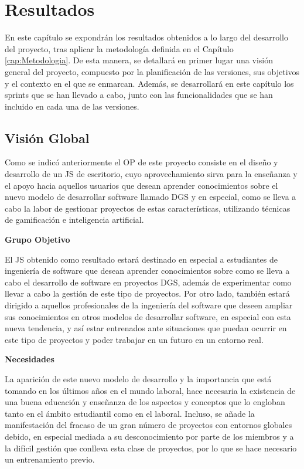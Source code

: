 \chapter{Resultados}
\label{cap:Resultados}

En este capítulo se expondrán los resultados obtenidos a lo largo del desarrollo del proyecto, tras aplicar la metodología definida en el Capítulo \ref{cap:Metodologia}. De esta manera, se detallará en primer lugar una visión general del proyecto, compuesto por la planificación de las versiones, sus objetivos y el contexto en el que se enmarcan. Además, se desarrollará en este capítulo los sprints que se han llevado a cabo, junto con las funcionalidades que se han incluido en cada una de las versiones.

\section{Visión Global}
\label{sec:VisionGlobal}

Como se indicó anteriormente el OP de este proyecto consiste en el diseño y desarrollo de un JS de escritorio, cuyo aprovechamiento sirva para la enseñanza y el apoyo hacia aquellos usuarios que desean aprender conocimientos sobre el nuevo modelo de desarrollar software llamado DGS y en especial, como se lleva a cabo la labor de gestionar proyectos de estas características, utilizando técnicas de gamificación e inteligencia artificial.

\textbf{Grupo Objetivo}

El JS obtenido como resultado estará destinado en especial a estudiantes de ingeniería de software que desean aprender conocimientos sobre como se lleva a cabo el desarrollo de software en proyectos DGS, además de experimentar como llevar a cabo la gestión de este tipo de proyectos. Por otro lado, también estará dirigido a aquellos profesionales de la ingeniería del software que deseen ampliar sus conocimientos en otros modelos de desarrollar software, en especial con esta nueva tendencia, y así estar entrenados ante situaciones que puedan ocurrir en este tipo de proyectos y poder trabajar en un futuro en un entorno real.

\textbf{Necesidades}

La aparición de este nuevo modelo de desarrollo y la importancia que está tomando en los últimos años en el mundo laboral, hace necesaria la existencia de una buena educación y enseñanza de los aspectos y conceptos que lo engloban tanto en el ámbito estudiantil como en el laboral. Incluso, se añade la manifestación del fracaso de un gran número de proyectos con entornos globales debido, en especial mediada a su desconocimiento por parte de los miembros y a la difícil gestión que conlleva esta clase de proyectos, por lo que se hace necesario un entrenamiento previo.

